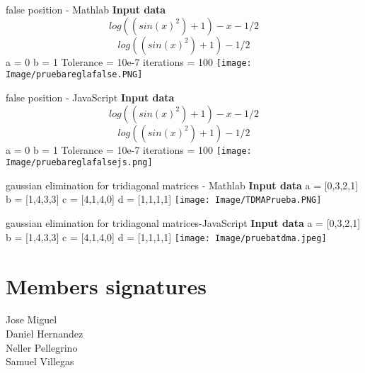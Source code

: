 \documentclass{article}
\begin{document}
\begin{section}{false position - Mathlab}
   \textbf{Input data}\newline
    \[log((sin(x)^2)+1)-x-1/2\]\newline
    \[log((sin(x)^2)+1)-1/2\]\newline
    a = 0\newline
    b = 1\newline
    Tolerance = 10e-7\newline
    iterations = 100 \newline\newline
    \texttt{[image: Image/pruebareglafalse.PNG]}
\end{section}
\begin{section}{false position - JavaScript}
   \textbf{Input data}\newline
    \[log((sin(x)^2)+1)-x-1/2\]\newline
    \[log((sin(x)^2)+1)-1/2\]\newline
    a = 0\newline
    b = 1\newline
    Tolerance = 10e-7\newline
    iterations = 100 \newline\newline
    \texttt{[image: Image/pruebareglafalsejs.png]}
\end{section}
\begin{section}{gaussian elimination for tridiagonal matrices - Mathlab}
   \textbf{Input data}\newline
   a = [0,3,2,1]\newline
   b = [1,4,3,3]\newline
   c = [4,1,4,0]\newline
   d = [1,1,1,1]\newline
    \texttt{[image: Image/TDMAPrueba.PNG]}
\end{section}
\begin{section}{gaussian elimination for tridiagonal matrices-JavaScript}
   \textbf{Input data}\newline
   a = [0,3,2,1]\newline
   b = [1,4,3,3]\newline
   c = [4,1,4,0]\newline
   d = [1,1,1,1]\newline
    \texttt{[image: Image/pruebatdma.jpeg]}
\end{section}

\section*{Members signatures}
Jose Miguel \\
Daniel Hernandez \\
Neller Pellegrino \\
Samuel Villegas \\
\end{document}
